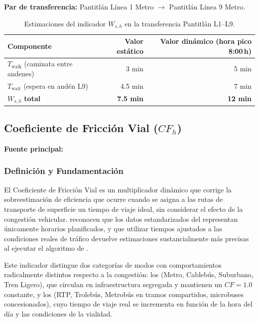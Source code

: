 \textbf{Par de transferencia:} Pantitlán Línea 1 Metro $\to$ Pantitlán Línea 9
Metro.
 
\begin{table}[H]
    \centering
    \caption{Estimaciones del indicador $W_{s,h}$ en la transferencia Pantitlán L1--L9.}
    \label{tab:penalizacion}
    \begin{tabularx}{\textwidth}{X r r}
        \toprule
        \textbf{Componente} & \textbf{Valor estático} &
        \textbf{Valor dinámico (hora pico 8:00\,h)} \\
        \midrule
        $T_{\text{walk}}$ (caminata entre andenes) & 3 min & 5 min \\
        $T_{\text{wait}}$ (espera en andén L9) & 4.5 min & 7 min \\
        $W_{s,h}$ \textbf{total} & \textbf{7.5 min} & \textbf{12 min} \\
        \bottomrule
    \end{tabularx}
\end{table}

\subsection{Coeficiente de Fricción Vial \texorpdfstring{($CF_h$)}{(CFh)}}
\label{subsec:friccion-vial}
 
\textbf{Fuente principal:} \citet{fortin2016innovative}
 
\subsubsection{Definición y Fundamentación}
 
El Coeficiente de Fricción Vial es un multiplicador dinámico que corrige la
sobreestimación de eficiencia que ocurre cuando se asigna a las rutas de
transporte
de superficie un tiempo de viaje ideal, sin considerar el efecto de la
congestión
vehicular. \citet{fortin2016innovative} reconocen que los datos
estandarizados del \gtfs{}
representan únicamente horarios planificados, y que utilizar tiempos ajustados a
las
condiciones reales de tráfico devuelve estimaciones sustancialmente más precisas
al
ejecutar el algoritmo de \dijkstra{}.
 
Este indicador distingue dos categorías de modos con comportamientos
radicalmente
distintos respecto a la congestión: los  (Metro,
Cablebús,
Suburbano, Tren Ligero), que circulan en infraestructura segregada y mantienen
un
$CF = 1.0$ constante, y los  (RTP, Trolebús,
Metrobús en tramos compartidos, microbuses concesionados), cuyo tiempo de viaje
real se incrementa en función de la hora del día y las condiciones de la
vialidad.
 
